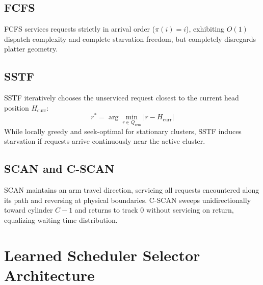 \documentclass[conference,10pt]{IEEEtran}
\begin{document}
\subsection{FCFS}
FCFS services requests strictly in arrival order ($\pi(i) = i$), exhibiting $O(1)$ dispatch complexity and complete starvation freedom, but completely disregards platter geometry.

\subsection{SSTF}
SSTF iteratively chooses the unserviced request closest to the current head position $H_{\text{curr}}$:
\begin{equation}
    r^* = \arg\min_{r \in Q_{\text{rem}}} |r - H_{\text{curr}}|
    \label{eq:sstf}
\end{equation}
While locally greedy and seek-optimal for stationary clusters, SSTF induces starvation if requests arrive continuously near the active cluster.

\subsection{SCAN and C-SCAN}
SCAN maintains an arm travel direction, servicing all requests encountered along its path and reversing at physical boundaries. C-SCAN sweeps unidirectionally toward cylinder $C-1$ and returns to track 0 without servicing on return, equalizing waiting time distribution.

\section{Learned Scheduler Selector Architecture}
\end{document}
